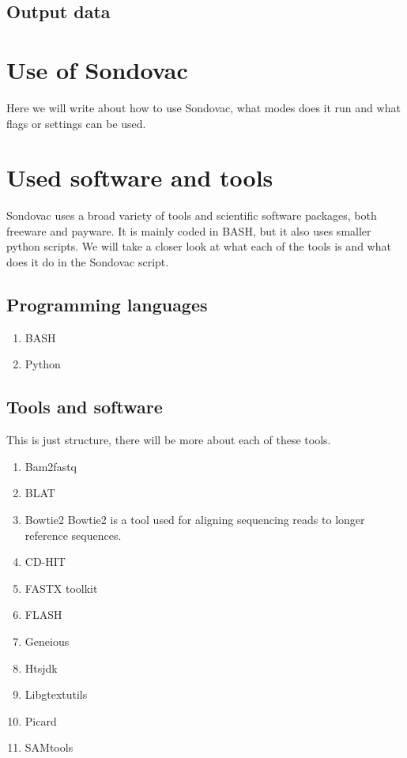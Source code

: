 \subsection{Output data}

\section{Use of Sondovac}
Here we will write about how to use Sondovac, what modes does it run and what flags or settings can be used. 
\section{Used software and tools}

Sondovac uses a broad variety of tools and scientific software packages, both freeware and payware. It is mainly coded in BASH, but it also uses smaller python 
scripts. We will take a closer look at what each of the tools is and what does it do in the Sondovac script. 

\subsection{Programming languages}
\begin{enumerate}
\item BASH
\item Python
\end{enumerate}

\subsection{Tools and software}

This is just structure, there will be more about each of these tools. 

\begin{enumerate}
\item Bam2fastq
\item BLAT
\item Bowtie2
Bowtie2 is a tool used for aligning sequencing reads to longer reference sequences. \cite{bowtie2}
\item CD-HIT
\item FASTX toolkit
\item FLASH
\item Geneious
\item Htsjdk
\item Libgtextutils
\item Picard
\item SAMtools
\end{enumerate}

